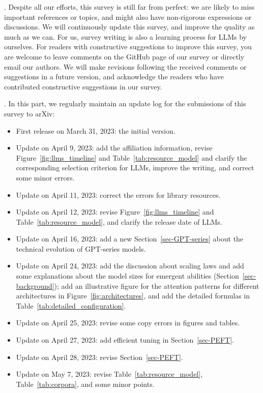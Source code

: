 {. Despite all our efforts, this survey is still far from perfect: we are likely to miss important references or topics, and might also have non-rigorous expressions or discussions. 
We will continuously update this survey, and improve the quality as much as we can. 
For us, survey writing is also a learning process for LLMs by ourselves. 
For readers with constructive suggestions to improve this survey, you are welcome to leave comments on the GitHub page of our survey or directly email our authors. 
We will make  revisions following the received comments or suggestions in a future version, and acknowledge the readers who have contributed constructive suggestions in our survey.

. In this part, we regularly  maintain an update log for the submissions of this survey to arXiv: 
\begin{itemize}
\item First release on March 31, 2023: the initial  version. 
\item Update on April 9, 2023: add the affiliation information, revise Figure~\ref{fig:llms_timeline} and Table~\ref{tab:resource_model} and clarify the corresponding selection criterion for LLMs, improve the writing,  and correct  some minor errors. 
\item Update on April 11, 2023: correct  the errors for library resources.  
\item Update on April 12, 2023: revise  Figure~\ref{fig:llms_timeline} and Table~\ref{tab:resource_model}, and clarify the release date of LLMs.
\item Update on April 16, 2023: add a new Section~\ref{sec-GPT-series} about the technical evolution of GPT-series models.
\item Update on April 24, 2023: add the discussion about scaling laws and add some explanations about the model sizes for emergent abilities (Section~\ref{sec-background}); add an illustrative figure for the attention patterns for different architectures in Figure~\ref{fig:architectures}, and add the detailed formulas in Table~\ref{tab:detailed_configuration}.
\item Update on April 25, 2023: revise some copy errors in figures and tables. 
\item Update on April 27, 2023: add efficient tuning in Section~\ref{sec-PEFT}.
\item Update on April 28, 2023: revise  Section~\ref{sec-PEFT}.
\item Update on May 7, 2023: revise Table~\ref{tab:resource_model}, Table~\ref{tab:corpora}, and some minor points.

\end{itemize}}
